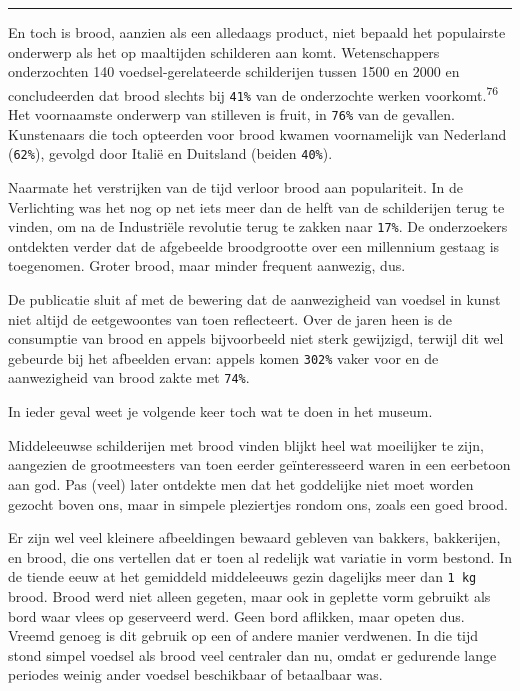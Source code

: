 \documentclass[
  11pt,
  dutch,
]{memoir}
\begin{document}
\pfbreak

En toch is brood, aanzien als een alledaags product, niet bepaald het
populairste onderwerp als het op maaltijden schilderen aan komt.
Wetenschappers onderzochten 140 voedsel-gerelateerde schilderijen tussen
1500 en 2000 en concludeerden dat brood slechts bij \texttt{41\%} van de
onderzochte werken voorkomt.\textsuperscript{76} Het voornaamste
onderwerp van stilleven is fruit, in \texttt{76\%} van de gevallen.
Kunstenaars die toch opteerden voor brood kwamen voornamelijk van
Nederland (\texttt{62\%}), gevolgd door Italië en Duitsland (beiden
\texttt{40\%}).

Naarmate het verstrijken van de tijd verloor brood aan populariteit. In
de Verlichting was het nog op net iets meer dan de helft van de
schilderijen terug te vinden, om na de Industriële revolutie terug te
zakken naar \texttt{17\%}. De onderzoekers ontdekten verder dat de
afgebeelde broodgrootte over een millennium gestaag is toegenomen.
Groter brood, maar minder frequent aanwezig, dus.

De publicatie sluit af met de bewering dat de aanwezigheid van voedsel
in kunst niet altijd de eetgewoontes van toen reflecteert. Over de jaren
heen is de consumptie van brood en appels bijvoorbeeld niet sterk
gewijzigd, terwijl dit wel gebeurde bij het afbeelden ervan: appels
komen \texttt{302\%} vaker voor en de aanwezigheid van brood zakte met
\texttt{74\%}.

In ieder geval weet je volgende keer toch wat te doen in het museum.

Middeleeuwse schilderijen met brood vinden blijkt heel wat moeilijker te
zijn, aangezien de grootmeesters van toen eerder geïnteresseerd waren in
een eerbetoon aan god. Pas (veel) later ontdekte men dat het goddelijke
niet moet worden gezocht boven ons, maar in simpele pleziertjes rondom
ons, zoals een goed brood.

Er zijn wel veel kleinere afbeeldingen bewaard gebleven van bakkers,
bakkerijen, en brood, die ons vertellen dat er toen al redelijk wat
variatie in vorm bestond. In de tiende eeuw at het gemiddeld middeleeuws
gezin dagelijks meer dan \texttt{1\ kg} brood. Brood werd niet alleen
gegeten, maar ook in geplette vorm gebruikt als bord waar vlees op
geserveerd werd. Geen bord aflikken, maar opeten dus. Vreemd genoeg is
dit gebruik op een of andere manier verdwenen. In die tijd stond simpel
voedsel als brood veel centraler dan nu, omdat er gedurende lange
periodes weinig ander voedsel beschikbaar of betaalbaar was.
\end{document}
